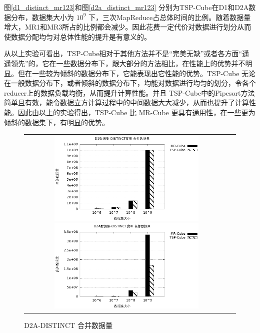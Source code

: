 图\ref{d1_distinct_mr123}和图\ref{d2a_distinct_mr123} 分别为TSP-Cube在D1和D2A数据分布，数据集大小为 ${10}^{9}$ 下，三次MapReduce占总体时间的比例。随着数据量增大，MR1和MR3所占的比例都会减少。因此花费一定代价对数据进行划分从而使数据分配均匀对总体性能的提升是有意义的。

从以上实验可看出，TSP-Cube相对于其他方法并不是``完美无缺”或者各方面``遥遥领先”的，它在一些数据分布下，跟大部分的方法相比，在性能上的优势并不明显。但在一些较为倾斜的数据分布下，它能表现出它性能的优势。TSP-Cube 无论在一般数据分布下，或者倾斜的数据分布下，均能对数据进行均匀的划分，令各个reducer上的数据负载均衡，从而提升计算性能。并且 TSP-Cube中的Pipesort方法简单且有效，能令数据立方计算过程中的中间数据大大减少，从而也提升了计算性能。因此由以上的实验得出，TSP-Cube 比 MR-Cube 更具有通用性，在一些更为倾斜的数据集下，有明显的优势。





\begin{figure}[!ht]
\begin{tabular}{cc}

\begin{minipage}[t]{0.5\textwidth}
\centering\includegraphics[width=3in]{picture/ch_experiment_gnuplot_eps/d1_distinct_interdata} 
\caption{D1-DISTINCT 合并数据量}\label{d1_distinct_interdata} 
\end{minipage}

\begin{minipage}[t]{0.5\textwidth}
\centering\includegraphics[width=3in]{picture/ch_experiment_gnuplot_eps/d2a_distinct_interdata} 
\caption{D2A-DISTINCT 合并数据量}\label{d2a_distinct_interdata} 
\end{minipage}

\end{tabular}
\end{figure}




